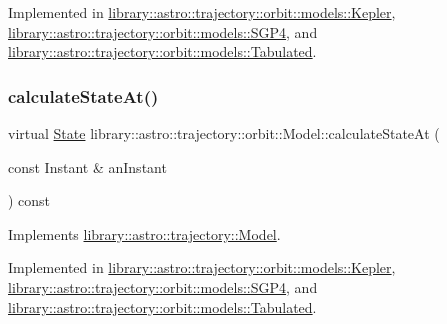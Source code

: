 Implemented in \hyperlink{classlibrary_1_1astro_1_1trajectory_1_1orbit_1_1models_1_1_kepler_a9ba435e737c10933f39d4817306810eb}{library\+::astro\+::trajectory\+::orbit\+::models\+::\+Kepler}, \hyperlink{classlibrary_1_1astro_1_1trajectory_1_1orbit_1_1models_1_1_s_g_p4_af1591139c936dd0c696972e5cb461009}{library\+::astro\+::trajectory\+::orbit\+::models\+::\+S\+G\+P4}, and \hyperlink{classlibrary_1_1astro_1_1trajectory_1_1orbit_1_1models_1_1_tabulated_aef0c3d3790f5399c9ae9f78a543a9d5b}{library\+::astro\+::trajectory\+::orbit\+::models\+::\+Tabulated}.

\mbox{\label{classlibrary_1_1astro_1_1trajectory_1_1orbit_1_1_model_a34198a504836b9779425da99d964d19c}} 
\subsubsection{\texorpdfstring{calculate\+State\+At()}{calculateStateAt()}}
{\footnotesize\ttfamily virtual \hyperlink{classlibrary_1_1astro_1_1trajectory_1_1_state}{State} library\+::astro\+::trajectory\+::orbit\+::\+Model\+::calculate\+State\+At (\begin{DoxyParamCaption}\item[{const Instant \&}]{an\+Instant }\end{DoxyParamCaption}) const\hspace{0.3cm}{\ttfamily [pure virtual]}}



Implements \hyperlink{classlibrary_1_1astro_1_1trajectory_1_1_model_acee9ee770c2ee1d1205b618e8f722ba4}{library\+::astro\+::trajectory\+::\+Model}.



Implemented in \hyperlink{classlibrary_1_1astro_1_1trajectory_1_1orbit_1_1models_1_1_kepler_a6354b3545decf1179289383679ebe2cd}{library\+::astro\+::trajectory\+::orbit\+::models\+::\+Kepler}, \hyperlink{classlibrary_1_1astro_1_1trajectory_1_1orbit_1_1models_1_1_s_g_p4_a5d94d349c464f7313017c795a9346084}{library\+::astro\+::trajectory\+::orbit\+::models\+::\+S\+G\+P4}, and \hyperlink{classlibrary_1_1astro_1_1trajectory_1_1orbit_1_1models_1_1_tabulated_a43db203d7257d25a5a3a6f0e03e62b7d}{library\+::astro\+::trajectory\+::orbit\+::models\+::\+Tabulated}.

